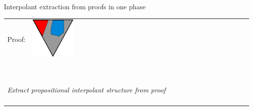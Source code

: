 \documentclass[final,hyperref={pdfpagelabels=true}]{beamer}
\newcommand{\colTwo}[1]{ {\color{TuWienBlue}#1}}
\newcommand{\colB}[1]{ \colTwo{#1} }
\newcommand{\gray}[1]{ {\color{InfosysDarkGrey}#1}}
\begin{document}
\begin{frame}
\begin{columns}[t]
\begin{column}{\mycolwidth}
\begin{block}{Interpolant extraction from proofs in one phase}
					\newcommand{\fakemulticolwidth}{0.28\textwidth}
					\begin{tabular}{p{}ll}

					Proof: 
					&

					\multicolumn{1}{m{\fakemulticolwidth}}{
						\includegraphics[width=0.2\textwidth]{figures/two_phase_draft_proof}
					}
					&
						\vspace*{0.5em}
					\\

					\multicolumn{2}{l}{
						\hspace*{10.35em}{$\Downarrow$} ~\parbox[c]{12em}{\emph{ Extract propositional interpolant structure from proof}}
						\vspace*{0.5em}
				}
				 \\
			 

					&
					\multicolumn{1}{m{\fakemulticolwidth}}{
					}
					$\dots \forall {x_5} \dots \gray Q({x_5}, \colB c) \dots$
						\vspace*{0.5em}
					\\


\end{tabular}
\end{block}
\end{column}
\end{columns}
\end{frame}
\end{document}
